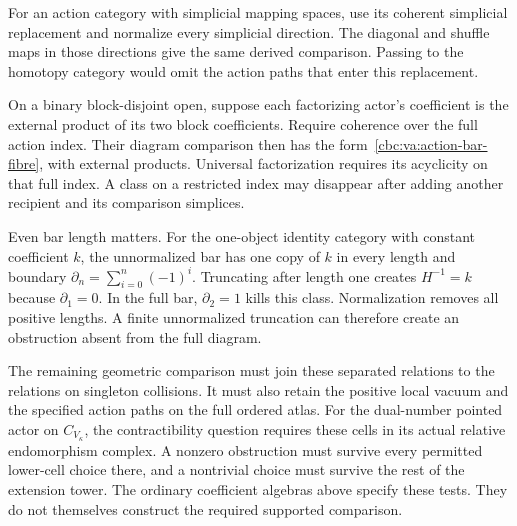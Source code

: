 For an action category with simplicial mapping
spaces, use its coherent simplicial replacement
and normalize every simplicial direction.
The diagonal and shuffle maps in those
directions give the same derived comparison.
Passing to the homotopy category would omit
the action paths that enter this replacement.

On a binary block-disjoint open, suppose each
factorizing actor's coefficient is the external product
of its two block coefficients.
Require coherence over the full action index. Their diagram comparison then has the
form~\eqref{cbc:va:action-bar-fibre}, with external
products. Universal factorization requires its
acyclicity on that full index. A class on a
restricted index may disappear after adding
another recipient and its comparison simplices.

Even bar length matters. For the one-object
identity category with constant coefficient
$k$, the unnormalized bar has one copy of
$k$ in every length and boundary
$\partial_n=\sum_{i=0}^n(-1)^i$.
Truncating after length one creates
$H^{-1}=k$ because $\partial_1=0$.
In the full bar, $\partial_2=1$ kills this
class. Normalization removes all positive
lengths. A finite unnormalized truncation
can therefore create an obstruction absent
from the full diagram.

The remaining geometric comparison must join
these separated relations to the relations
on singleton collisions. It must also retain
the positive local vacuum and the specified
action paths on the full ordered atlas.
For the dual-number pointed actor on $C_{V_\kappa}$,
the contractibility question requires these cells
in its actual relative endomorphism complex. A nonzero obstruction
must survive every permitted lower-cell
choice there, and a nontrivial choice must
survive the rest of the extension tower.
The ordinary coefficient algebras above
specify these tests. They do not themselves
construct the required supported comparison.

